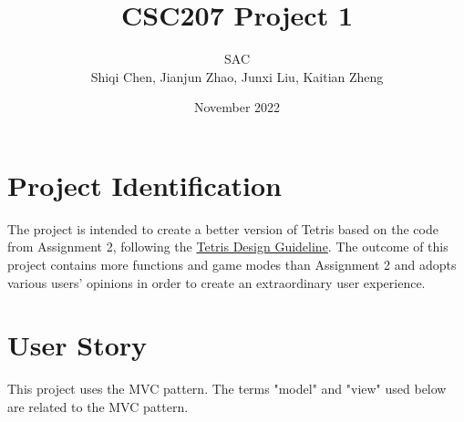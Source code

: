 \documentclass{article}
\title{CSC207 Project 1}
\author{SAC \\ Shiqi Chen, Jianjun Zhao, Junxi Liu, Kaitian Zheng}
\date{November 2022}
\begin{document}
\maketitle


\section{Project Identification}
 The project is intended to create a better version of Tetris based on the code from Assignment 2, following the \href{https://tetris.wiki/Tetris_Guideline}{Tetris Design Guideline}. The outcome of this project contains more functions and game modes than Assignment 2 and adopts various users' opinions in order to create an extraordinary user experience.
\section{User Story}
This project uses the MVC pattern. The terms "model" and "view" used below are related to the MVC pattern.
\end{document}
